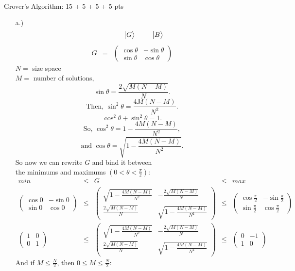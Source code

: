 \documentclass[12pt]{article}
\makeatletter
\newcommand{\<}{\langle}
\renewcommand{\>}{\rangle}
\newenvironment{problem}{\@startsection
       {section}
       {1}
       {-.2em}
       {-3.5ex plus -1ex minus -.2ex}
       {2.3ex plus .2ex}
       {\pagebreak[3]
       \large\bf\noindent{Problem }
       }
       }
       {%
       \begin{center}\large\bf \end{center}}
\def\ket#1{\big|{#1}\big>}
\makeatother
\begin{document}
\begin{problem}{Grover's Algorithm: 15 + 5 + 5 + 5 pts}
\begin{enumerate}
\item[a.)]$$\hspace*{1.2cm}\ket{G} \hspace*{.9cm} \ket{B}$$ $$
\begin{array}{ccc}
G &=& \left( 
		\begin{array}{cc}
		\cos\theta & -\sin\theta\\
		\sin\theta & \cos\theta		
		\end{array}
      \right)
\end{array}
$$
$N = $ size space\\
$M = $ number of solutions,
$$\sin\theta = \frac{2\sqrt{M(N-M)}}{N}.$$
$$\text{Then, }\sin^2\theta = \frac{4M(N-M)}{N^2}.$$
$$\cos^2\theta + \sin^2\theta = 1.$$
$$\text{So, }  \cos^2\theta = 1 - \frac{4M(N-M)}{N^2},$$
$$\text{and }  \cos\theta = \sqrt{1 - \frac{4M(N-M)}{N^2}}.$$
So now we can rewrite $G$ and bind it between \\ \hspace*{4cm} the minimums and maximums $(0 < \theta < \frac{\pi}{2})$:
$$
\begin{array}{ccccc}
min &\leq& G &\leq& max\\
\left(\begin{array}{cc}
		\cos 0 & -\sin 0\\
		\sin 0 & \cos 0		
		\end{array}
      \right) 
      &\leq& 
\left(\begin{array}{cc}
	\sqrt{1 - \frac{4M(N-M)}{N^2}} & -\frac{2\sqrt{M(N-M)}}{N}\\
	\frac{2\sqrt{M(N-M)}}{N} & \sqrt{1 - \frac{4M(N-M)}{N^2}}
\end{array}\right) 
	 &\leq&
\left(\begin{array}{cc}
		\cos \frac{\pi}{2} & -\sin \frac{\pi}{2}\\
		\sin \frac{\pi}{2} & \cos \frac{\pi}{2}		
		\end{array}
      \right)\\
      
\left(\begin{array}{cc}
		1 & 0\\
		0 & 1		
		\end{array}
      \right) 
      &\leq& 
\left(\begin{array}{cc}
	\sqrt{1 - \frac{4M(N-M)}{N^2}} & -\frac{2\sqrt{M(N-M)}}{N}\\
	\frac{2\sqrt{M(N-M)}}{N} & \sqrt{1 - \frac{4M(N-M)}{N^2}}
\end{array}\right) 
	 &\leq&
\left(\begin{array}{cc}
		0 & -1\\
		1 & 0
		\end{array}
      \right)
\end{array}
$$
And if $M \leq \frac{N}{2}$, then $0 \leq M \leq \frac{N}{2}$:


\end{enumerate}
\end{problem}
\end{document}
